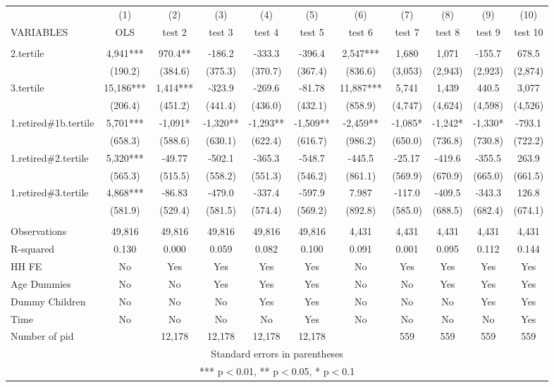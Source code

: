 \begin{tabular}{lcccccccccc} \hline
 & (1) & (2) & (3) & (4) & (5) & (6) & (7) & (8) & (9) & (10) \\
VARIABLES & OLS & test 2 & test 3 & test 4 & test 5 & test 6 & test 7 & test 8 & test 9 & test 10 \\ \hline
 &  &  &  &  &  &  &  &  &  &  \\
2.tertile & 4,941*** & 970.4** & -186.2 & -333.3 & -396.4 & 2,547*** & 1,680 & 1,071 & -155.7 & 678.5 \\
 & (190.2) & (384.6) & (375.3) & (370.7) & (367.4) & (836.6) & (3,053) & (2,943) & (2,923) & (2,874) \\
3.tertile & 15,186*** & 1,414*** & -323.9 & -269.6 & -81.78 & 11,887*** & 5,741 & 1,439 & 440.5 & 3,077 \\
 & (206.4) & (451.2) & (441.4) & (436.0) & (432.1) & (858.9) & (4,747) & (4,624) & (4,598) & (4,526) \\
1.retired\#1b.tertile & 5,701*** & -1,091* & -1,320** & -1,293** & -1,509** & -2,459** & -1,085* & -1,242* & -1,330* & -793.1 \\
 & (658.3) & (588.6) & (630.1) & (622.4) & (616.7) & (986.2) & (650.0) & (736.8) & (730.8) & (722.2) \\
1.retired\#2.tertile & 5,320*** & -49.77 & -502.1 & -365.3 & -548.7 & -445.5 & -25.17 & -419.6 & -355.5 & 263.9 \\
 & (565.3) & (515.5) & (558.2) & (551.3) & (546.2) & (861.1) & (569.9) & (670.9) & (665.0) & (661.5) \\
1.retired\#3.tertile & 4,868*** & -86.83 & -479.0 & -337.4 & -597.9 & 7.987 & -117.0 & -409.5 & -343.3 & 126.8 \\
 & (581.9) & (529.4) & (581.5) & (574.4) & (569.2) & (892.8) & (585.0) & (688.5) & (682.4) & (674.1) \\
 &  &  &  &  &  &  &  &  &  &  \\
Observations & 49,816 & 49,816 & 49,816 & 49,816 & 49,816 & 4,431 & 4,431 & 4,431 & 4,431 & 4,431 \\
R-squared & 0.130 & 0.000 & 0.059 & 0.082 & 0.100 & 0.091 & 0.001 & 0.095 & 0.112 & 0.144 \\
HH FE & No & Yes & Yes & Yes & Yes & No & Yes & Yes & Yes & Yes \\
Age Dummies & No & No & Yes & Yes & Yes & No & No & Yes & Yes & Yes \\
Dummy Children & No & No & No & Yes & Yes & No & No & No & Yes & Yes \\
Time & No & No & No & No & Yes & No & No & No & No & Yes \\
 Number of pid &  & 12,178 & 12,178 & 12,178 & 12,178 &  & 559 & 559 & 559 & 559 \\ \hline
\multicolumn{11}{c}{ Standard errors in parentheses} \\
\multicolumn{11}{c}{ *** p$<$0.01, ** p$<$0.05, * p$<$0.1} \\
\end{tabular}

